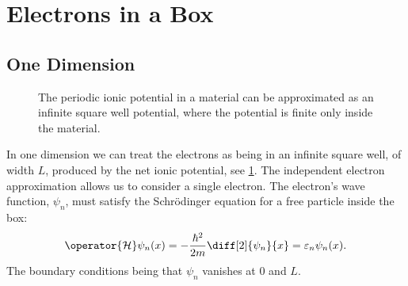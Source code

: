 \documentclass[fleqn]{NotesClass}
\newcommand*{\hamiltonian}{\mathcal{H}}
\begin{document}
    \section{Electrons in a Box}
    \subsection{One Dimension}
    \begin{figure}
        \caption[Ionic potentials approximate an infinite square well]{The periodic ionic potential in a material can be approximated as an infinite square well potential, where the potential is finite only inside the material.}
        \label{fig:ionic potential square well}
    \end{figure}
    
    In one dimension we can treat the electrons as being in an infinite square well, of width \(L\), produced by the net ionic potential, see \cref{fig:ionic potential square well}.
    The independent electron approximation allows us to consider a single electron.
    The electron's wave function, \(\psi_n\), must satisfy the Schr\"odinger equation for a free particle inside the box:
    \begin{equation}
        \operator{\hamiltonian}\psi_n(x) = -\frac{\hbar^2}{2m} \diff[2]{\psi_n}{x} = \varepsilon_n\psi_n(x).
    \end{equation}
    The boundary conditions being that \(\psi_n\) vanishes at \(0\) and \(L\).
    
\end{document}
